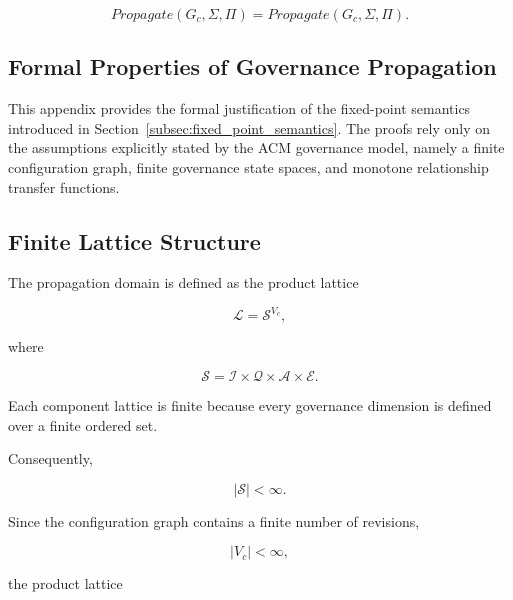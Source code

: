 \documentclass[10pt]{article}
\begin{document}
\begin{equation}
	Propagate
	(G_c,\Sigma,\Pi)
	=
	Propagate
	(G_c,\Sigma,\Pi).
	\label{eq:gp4}
\end{equation}

\subsection{Formal Properties of Governance Propagation}
\label{appendix:fixed_point_proofs}

This appendix provides the formal justification of the fixed-point semantics
introduced in Section~\ref{subsec:fixed_point_semantics}. The proofs rely only
on the assumptions explicitly stated by the ACM governance model, namely a
finite configuration graph, finite governance state spaces, and monotone
relationship transfer functions.


\subsection{Finite Lattice Structure}

The propagation domain is defined as the product lattice

\begin{equation}
\mathcal{L}
=
\mathcal{S}^{V_c},
\end{equation}

where

\begin{equation}
\mathcal{S}
=
\mathcal{I}
\times
\mathcal{Q}
\times
\mathcal{A}
\times
\mathcal{E}.
\end{equation}

Each component lattice is finite because every governance dimension is defined
over a finite ordered set.

Consequently,

\begin{equation}
|\mathcal{S}|
<
\infty.
\end{equation}

Since the configuration graph contains a finite number of revisions,

\begin{equation}
|V_c|
<
\infty,
\end{equation}

the product lattice
\end{document}
